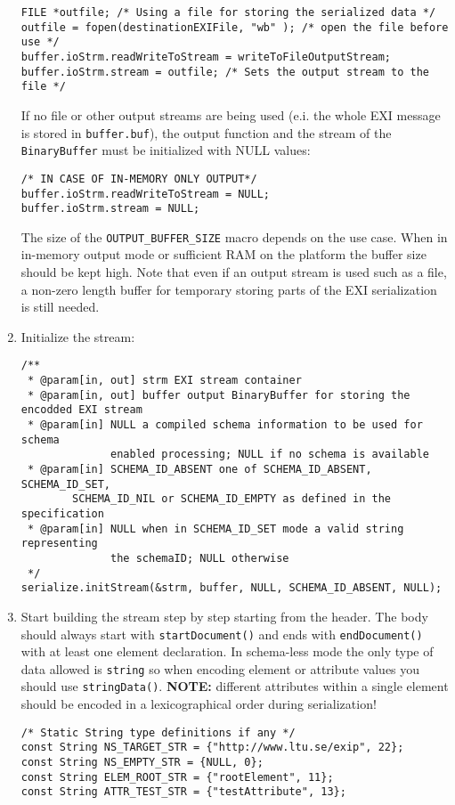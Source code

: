 \begin{enumerate}
\begin{lstlisting}
FILE *outfile; /* Using a file for storing the serialized data */
outfile = fopen(destinationEXIFile, "wb" ); /* open the file before use */
buffer.ioStrm.readWriteToStream = writeToFileOutputStream;
buffer.ioStrm.stream = outfile; /* Sets the output stream to the file */
\end{lstlisting}
If no file or other output streams are being used (e.i. the whole EXI message is
stored in \texttt{buffer.buf}), the output function and the stream
of the \texttt{BinaryBuffer} must be initialized with NULL values:
\begin{lstlisting}
/* IN CASE OF IN-MEMORY ONLY OUTPUT*/
buffer.ioStrm.readWriteToStream = NULL;
buffer.ioStrm.stream = NULL;
\end{lstlisting}

The size of the \texttt{OUTPUT\_BUFFER\_SIZE} macro depends on the
use case. When in in-memory output mode or sufficient RAM on the
platform the buffer size should be kept high. Note that even if
an output stream is used such as a file, a non-zero length buffer
for temporary storing parts of the EXI serialization is still needed.

 \item \label{item:initialization} Initialize the stream:
\begin{lstlisting}
/**
 * @param[in, out] strm EXI stream container
 * @param[in, out] buffer output BinaryBuffer for storing the encodded EXI stream
 * @param[in] NULL a compiled schema information to be used for schema
		      enabled processing; NULL if no schema is available
 * @param[in] SCHEMA_ID_ABSENT one of SCHEMA_ID_ABSENT, SCHEMA_ID_SET,
		SCHEMA_ID_NIL or SCHEMA_ID_EMPTY as defined in the specification
 * @param[in] NULL when in SCHEMA_ID_SET mode a valid string representing
		      the schemaID; NULL otherwise
 */
serialize.initStream(&strm, buffer, NULL, SCHEMA_ID_ABSENT, NULL);                      
\end{lstlisting}

 \item \label{item:encoding} Start building the stream step by step starting from the header. The body should always start with
    \texttt{startDocument()} and ends with \texttt{endDocument()} with at least one element declaration.
In schema-less mode the only type of data allowed is \texttt{string} so when encoding element or
attribute values you should use \texttt{stringData()}. \linebreak 
\textbf{NOTE:} different attributes within a single element should be encoded in a lexicographical order during serialization!
\begin{lstlisting}
/* Static String type definitions if any */
const String NS_TARGET_STR = {"http://www.ltu.se/exip", 22};
const String NS_EMPTY_STR = {NULL, 0};
const String ELEM_ROOT_STR = {"rootElement", 11};
const String ATTR_TEST_STR = {"testAttribute", 13};


\end{lstlisting}
\end{enumerate}
